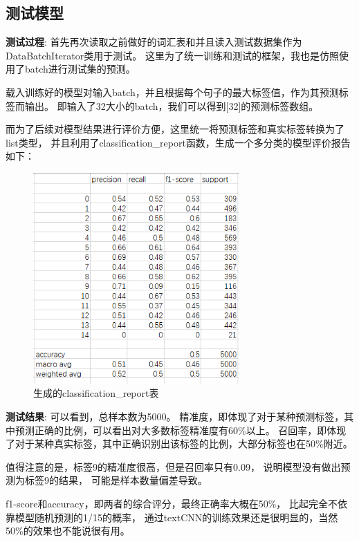 \documentclass[11pt]{article}
\begin{document}
\begin{CJK*}{UTF8}{gbsn}
\subsection{测试模型}

{\bf 测试过程}: 
首先再次读取之前做好的词汇表和并且读入测试数据集作为DataBatchIterator类用于测试。
这里为了统一训练和测试的框架，我也是仿照使用了batch进行测试集的预测。

载入训练好的模型对输入batch，并且根据每个句子的最大标签值，作为其预测标签而输出。
即输入了32大小的batch，我们可以得到[32]的预测标签数组。

而为了后续对模型结果进行评价方便，这里统一将预测标签和真实标签转换为了list类型，
并且利用了classification\_report函数，生成一个多分类的模型评价报告如下：

\begin{figure}[H] %
  \centering %
  \includegraphics[width=0.7\textwidth]{report.png} %
  \caption{生成的classification\_report表} %
  \label{Fig.main2} %
  \end{figure}

{\bf 测试结果}: 
可以看到，总样本数为5000。
精准度，即体现了对于某种预测标签，其中预测正确的比例，可以看出对大多数标签精准度有60\%以上。
召回率，即体现了对于某种真实标签，其中正确识别出该标签的比例，大部分标签也在50\%附近。

值得注意的是，标签9的精准度很高，但是召回率只有0.09，
说明模型没有做出预测为标签9的结果，
可能是样本数量偏差导致。

f1-score和accuracy，即两者的综合评分，最终正确率大概在50\%，
比起完全不依靠模型随机预测的1/15的概率，
通过textCNN的训练效果还是很明显的，当然50\%的效果也不能说很有用。


\end{CJK*}
\end{document}
